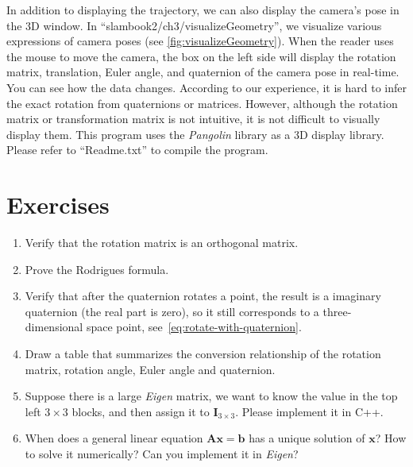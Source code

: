 In addition to displaying the trajectory, we can also display the camera's pose in the 3D window. In ``slambook2/ch3/visualizeGeometry'', we visualize various expressions of camera poses (see \autoref{fig:visualizeGeometry}). When the reader uses the mouse to move the camera, the box on the left side will display the rotation matrix, translation, Euler angle, and quaternion of the camera pose in real-time. You can see how the data changes. According to our experience, it is hard to infer the exact rotation from quaternions or matrices. However, although the rotation matrix or transformation matrix is not intuitive, it is not difficult to visually display them. This program uses the \textit{Pangolin} library as a 3D display library. Please refer to ``Readme.txt'' to compile the program.

\section*{Exercises}
\begin{enumerate}
	\item Verify that the rotation matrix is an orthogonal matrix.
	\item Prove the Rodrigues formula.
	\item Verify that after the quaternion rotates a point, the result is a imaginary quaternion (the real part is zero), so it still corresponds to a three-dimensional space point, see~\eqref{eq:rotate-with-quaternion}.
	\item Draw a table that summarizes the conversion relationship of the rotation matrix, rotation angle, Euler angle and quaternion.
	\item Suppose there is a large \textit{Eigen} matrix, we want to know the value in the top left $3 \times 3$ blocks, and then assign it to $\mathbf{I}_{3 \times 3}$. Please implement it in C++.
	\item When does a general linear equation $\mathbf{A} \mathbf{x}=\mathbf{b}$ has a unique solution of $\mathbf{x}$? How to solve it numerically? Can you implement it in \textit{Eigen}?
\end{enumerate}
